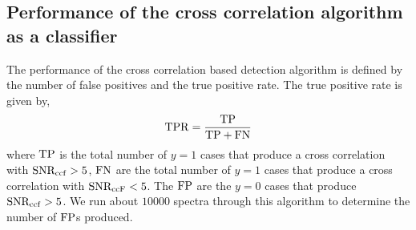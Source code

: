\subsection{Performance of the cross correlation algorithm as a classifier}
The performance of the cross correlation based detection algorithm is defined by the number of false positives and the true positive rate.
The true positive rate is given by,
\begin{equation}
   \rm{TPR} = \dfrac{TP}{TP+FN}
\end{equation}
where $\rm{TP}$ is the total number of $y=1$ cases that produce a cross correlation with $\rm{SNR_{ccf}}>5$,
$\rm{FN}$ are the total number of $y=1$ cases that produce a cross correlation with $\rm{SNR_{ccF}}<5$.
The $\rm{FP}$ are the $y=0$ cases that produce $\rm{SNR_{ccf}}>5$.
We run about $10000$ spectra through this algorithm to determine the number of $\rm{FP}$s produced.

